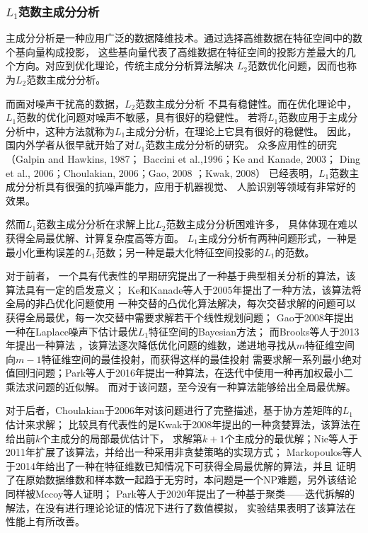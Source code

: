 \subsubsection{$L_1$范数主成分分析}
主成分分析是一种应用广泛的数据降维技术。通过选择高维数据在特征空间中的数个基向量构成投影，
这些基向量代表了高维数据在特征空间的投影方差最大的几个方向。对应到优化理论，传统主成分分析算法解决
$L_2$范数优化问题，因而也称为$L_2$范数主成分分析。

而面对噪声干扰高的数据，$L_2$范数主成分分析
不具有稳健性。而在优化理论中，$L_1$范数的优化问题对噪声不敏感，具有很好的稳健性。
若将$L_1$范数应用于主成分分析中，这种方法就称为$L_1$主成分分析，在理论上它具有很好的稳健性。
因此，国内外学者从很早就开始了对$L_1$范数主成分分析的研究。
众多应用性的研究（Galpin and Hawkins, 1987\cite{galpin1987methods}；
Baccini et al.,1996\cite{baccini1996l1}；Ke and Kanade, 2003\cite{ke2003robust}；
Ding et al., 2006\cite{ding2006r}；Choulakian, 2006\cite{choulakian2006l1}；Gao, 2008\cite{gao2008robust}
；Kwak, 2008\cite{kwak2008principal}）
已经表明，$L_1$范数主成分分析具有很强的抗噪声能力，应用于机器视觉\cite{ke2005robust}、
人脸识别\cite{kwak2008principal}等领域有非常好的效果。

然而$L_1$范数主成分分析在求解上比$L_2$范数主成分分析困难许多，
具体体现在难以获得全局最优解、计算复杂度高等方面。
$L_1$主成分分析有两种问题形式，一种是最小化重构误差的$L_1$范数；另一种是最大化特征空间投影的$L_1$的范数。

对于前者，
一个具有代表性的早期研究\cite{baccini1996l1}提出了一种基于典型相关分析的算法，该算法具有一定的启发意义；
Ke和Kanade等人于2005年提出了一种方法\cite{ke2005robust}，该算法将全局的非凸优化问题使用
一种交替的凸优化算法解决，每次交替求解的问题可以获得全局最优，每一次交替中需要求解若干个线性规划问题；
Gao于2008年提出一种在Laplace噪声下估计最优$L_1$特征空间的Bayesian方法\cite{gao2008robust}；
而Brooks等人于2013年提出一种算法
\cite{brooks2013pure}，该算法逐次降低优化问题的维数，递进地寻找从$m$特征维空间向$m-1$特征维空间的最佳投射，而获得这样的最佳投射
需要求解一系列最小绝对值回归问题；Park等人于2016年提出一种算法\cite{park2016iteratively}，在迭代中使用一种再加权最小二乘法求问题的近似解。
而对于该问题，至今没有一种算法能够给出全局最优解。

对于后者，Choulakian于2006年对该问题进行了完整描述\cite{choulakian2006l1}，基于协方差矩阵的$L_1$估计\cite{galpin1987methods}来求解；
比较具有代表性的是Kwak于2008年提出的一种贪婪算法\cite{kwak2008principal}，该算法在给出前$k$个主成分的局部最优估计下，
求解第$k+1$个主成分的最优解；Nie等人于2011年扩展了该算法，并给出一种采用非贪婪策略的实现方式\cite{nie2011robust}；
Markopoulos等人于2014年给出了一种在特征维数已知情况下可获得全局最优解的算法\cite{markopoulos2014optimal}，并且
证明了在原始数据维数和样本数一起趋于无穷时，本问题是一个NP难题，另外该结论同样被Mccoy\cite{mccoy2010two}等人证明；
Park等人于2020年提出了一种基于聚类——迭代拆解的解法\cite{park2021optimization}，在没有进行理论论证的情况下进行了数值模拟，
实验结果表明了该算法在性能上有所改善。

